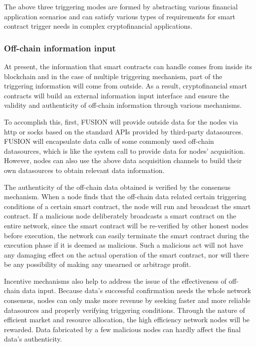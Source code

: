 \documentclass[a4paper,12pt]{article}
\begin{document}
The above three triggering modes are formed by abstracting various financial application scenarios and can satisfy various types of requirements for smart contract trigger needs in complex cryptofinancial applications.

\subsubsection{Off-chain information input}

At present, the information that smart contracts can handle comes from inside its blockchain and in the case of multiple triggering mechanism, part of the triggering information will come from outside. As a result, cryptofinancial smart contracts will build an external information input interface and ensure the validity and authenticity of off-chain information through various mechanisms.

To accomplish this, first, FUSION will provide outside data for the nodes via http or socks based on the standard APIs provided by third-party datasources. FUSION will encapsulate data calls of some commonly used off-chain datasources, which is like the system call to provide data for nodes' acquisition. However, nodes can also use the above data acquisition channels to build their own datasources to obtain relevant data information.

The authenticity of the off-chain data obtained is verified by the consensus mechanism. When a node finds that the off-chain data related certain triggering conditions of a certain smart contract, the node will run and broadcast the smart contract. If a malicious node deliberately broadcasts a smart contract on the entire network, since the smart contract will be re-verified by other honest nodes before execution, the network can easily terminate the smart contract during the execution phase if it is deemed as malicious. Such a malicious act will not have any damaging effect on the actual operation of the smart contract, nor will there be any possibility of making any unearned or arbitrage profit.

Incentive mechanisms also help to address the issue of the effectiveness of off-chain data input. Because data's successful confirmation needs the whole network consensus, nodes can only make more revenue by seeking faster and more reliable datasources and properly verifying triggering conditions. Through the nature of efficient market and resource allocation, the high efficiency network nodes will be rewarded. Data fabricated by a few malicious nodes can hardly affect the final data's authenticity.
\end{document}
